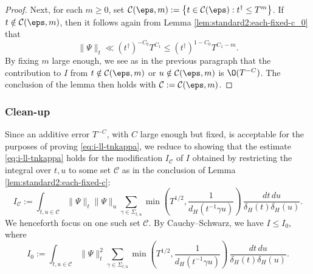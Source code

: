 \begin{proof}
  Next, for each $m \geq 0$, set $\mathcal{C}(\eps,m) := \left\{ t \in \mathcal{C}(\eps) : t^\dagger \leq T^m \right\}$.  If $t \notin \mathcal{C}(\eps,m)$, then it follows again from Lemma \ref{lem:standard2:each-fixed-c_0} that
  \begin{equation*}
    \|\Psi\|_t \ll (t^\dagger )^{-C_0} T^{C_1} \leq (t^\dagger ) ^{1 - C_0} T^{C_1 - m}.
  \end{equation*}
  By fixing $m$ large enough, we see as in the previous paragraph that the contribution to $I$ from $t \notin \mathcal{C}(\eps,m)$ or $u \notin \mathcal{C}(\eps,m)$ is $\O(T^{-C})$.  The conclusion of the lemma then holds with $\mathcal{C} := \mathcal{C}(\eps,m)$.
\end{proof}

\subsubsection{Clean-up}
Since an additive error $T^{-C}$, with $C$ large enough but fixed, is acceptable for the purposes of proving \eqref{eq:i-ll-tnkappa}, we reduce to showing that the estimate \eqref{eq:i-ll-tnkappa} holds for the modification $I_{\mathcal{C}}$ of $I$ obtained by restricting the integral over $t,u$ to some set $\mathcal{C}$ as in the conclusion of Lemma \ref{lem:standard2:each-fixed-c}:
\begin{equation*}
  I_{\mathcal{C}} :=
  \int_{
    t, u \in \mathcal{C}
  }
  \|\Psi\|_t \|\Psi\|_u
  \sum_{\gamma \in \Sigma_{t,u}}
  \min \left( T^{1/2}, \frac{1}{d_H(t^{-1} \gamma u)} \right) \, \frac{d t \, d u}{\delta_H(t) \delta_H(u)}.
\end{equation*}
We henceforth focus on one such set $\mathcal{C}$.  By Cauchy--Schwarz, we have $I \leq I_0$, where
\begin{equation*}
  I_0
  := \int_{t, u \in \mathcal{C} } \|\Psi\|_t^2
  \sum_{\gamma \in \Sigma_{t,u}}
  \min \left( T^{1/2}, \frac{1}{d_H(t^{-1} \gamma u)} \right)
  \, \frac{d t \, d u}{\delta_H(t) \delta_H(u)}.
\end{equation*}

